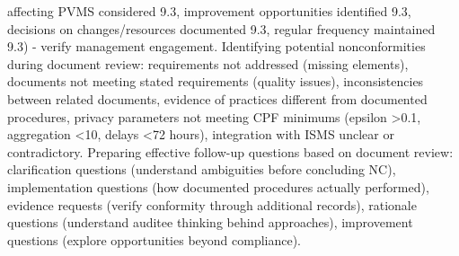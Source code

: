 \documentclass[11pt,a4paper]{article}
\begin{document}
affecting PVMS considered 9.3, improvement opportunities identified 9.3, decisions on changes/resources documented 9.3, regular frequency maintained 9.3) - verify management engagement. Identifying potential nonconformities during document review: requirements not addressed (missing elements), documents not meeting stated requirements (quality issues), inconsistencies between related documents, evidence of practices different from documented procedures, privacy parameters not meeting CPF minimums (epsilon >0.1, aggregation <10, delays <72 hours), integration with ISMS unclear or contradictory. Preparing effective follow-up questions based on document review: clarification questions (understand ambiguities before concluding NC), implementation questions (how documented procedures actually performed), evidence requests (verify conformity through additional records), rationale questions (understand auditee thinking behind approaches), improvement questions (explore opportunities beyond compliance).
\end{document}
